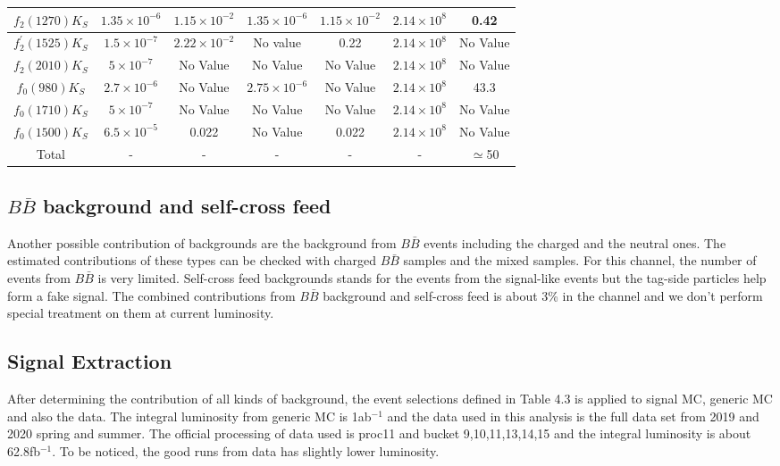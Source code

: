 \begin{table}
\begin{tabular}{|c|c|c|c|c|c|c|}
		\hline
		$f_2(1270)K_S$ & $1.35\times 10^{-6}$ & $1.15\times 10^{-2}$ & $1.35\times 10^{-6}$ & $1.15\times 10^{-2}$ & $2.14\times 10^8$ & 0.42 \\
		\hline
		$f_{2}^{'}(1525)K_S$ & $1.5\times 10^{-7} $ & $2.22\times 10^{-2}$ & No value & 0.22 & $2.14\times 10^8$ & No Value \\
		\hline
		$f_2(2010)K_S$ & $5\times 10^{-7}$ & No Value  & No Value  & No Value  & $2.14\times 10^8$ & No Value \\
		\hline
		$f_0(980)K_S$ & $2.7\times 10^{-6}$ & No Value & $2.75\times 10^{-6}$ & No Value & $2.14\times 10^8$ & 43.3 \\
		\hline
		$f_0(1710)K_S$ & $5\times 10^{-7}$ & No Value  & No Value  & No Value  & $2.14\times 10^8$ & No Value \\
		\hline
		$f_0(1500)K_S$ & $6.5\times 10^{-5}$ & 0.022 & No Value & 0.022 & $2.14\times 10^8$ & No Value \\
		\hline
		Total  & - & - & - & - & - & $\simeq$50 \\
		\hline
	\end{tabular}
\end{table}


\subsection{$B\bar{B}$ background and self-cross feed}
Another possible contribution of backgrounds are the background from $B\bar{B}$ events including the charged and the neutral ones. The estimated contributions of these types can be checked with charged $B\bar{B}$ samples and the mixed samples. For this channel, the number of events from  \textbf{$B\bar{B}$} is very limited. Self-cross feed backgrounds stands for the events from the signal-like events but the tag-side particles help form a fake signal. The combined contributions from $B\bar{B}$ background and self-cross feed is about 3\% in the channel and we don't perform special treatment on them at current luminosity.

\subsection{Signal Extraction}
After determining the contribution of all kinds of background, the event selections defined in Table 4.3 is applied to signal MC, generic MC and also the data. The integral luminosity from generic MC is 1ab$^{-1}$ and the data used in this analysis is the full data set from 2019 and 2020 spring and summer. 
The official processing of data used is proc11 and bucket 9,10,11,13,14,15 and the integral luminosity is about 62.8fb$^{-1}$. To be noticed, the good runs from data has slightly lower luminosity. 

